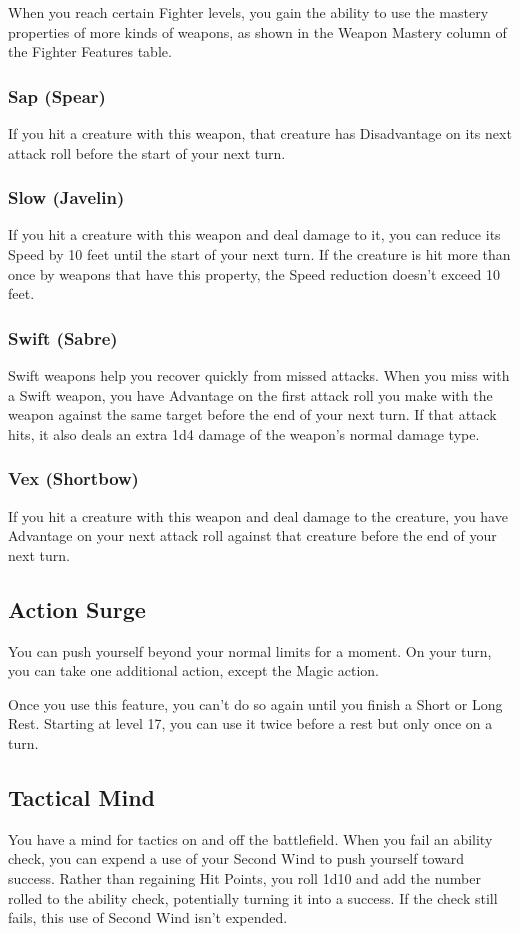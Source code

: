 \documentclass[letterpaper,openany,oneside,twocolumn]{book}
\begin{document}
When you reach certain Fighter levels, you gain the ability to use the mastery properties of more kinds of weapons, as shown in the Weapon Mastery column of the Fighter Features table.
\subsubsection*{Sap (Spear)}
If you hit a creature with this weapon, that creature has Disadvantage on its next attack roll before the start of your next turn.
\subsubsection*{Slow (Javelin)}
If you hit a creature with this weapon and deal damage to it, you can reduce its Speed by 10 feet until the start of your next turn. If the creature is hit more than once by weapons that have this property, the Speed reduction doesn't exceed 10 feet.
\subsubsection*{Swift (Sabre)}
Swift weapons help you recover quickly from missed attacks. When you miss with a Swift weapon, you have Advantage on the first attack roll you make with the weapon against the same target before the end of your next turn. If that attack hits, it also deals an extra 1d4 damage of the weapon's normal damage type.
\subsubsection*{Vex (Shortbow)}
If you hit a creature with this weapon and deal damage to the creature, you have Advantage on your next attack roll against that creature before the end of your next turn.
\subsection*{Action Surge}
You can push yourself beyond your normal limits for a moment. On your turn, you can take one additional action, except the Magic action.

Once you use this feature, you can't do so again until you finish a Short or Long Rest. Starting at level 17, you can use it twice before a rest but only once on a turn.
\subsection*{Tactical Mind}
You have a mind for tactics on and off the battlefield. When you fail an ability check, you can expend a use of your Second Wind to push yourself toward success. Rather than regaining Hit Points, you roll 1d10 and add the number rolled to the ability check, potentially turning it into a success. If the check still fails, this use of Second Wind isn't expended.\\
\end{document}
